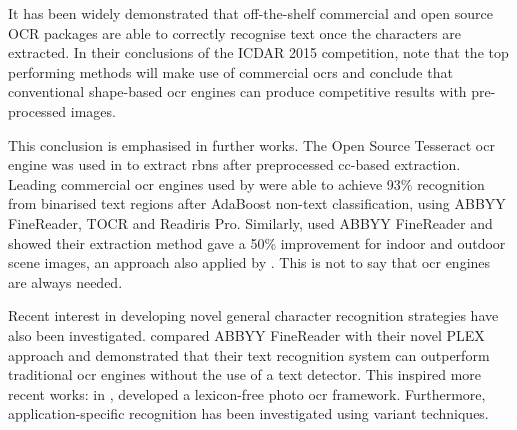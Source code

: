 It has been widely demonstrated that off-the-shelf commercial and open source OCR packages are able to correctly recognise text once the characters are extracted. In their conclusions of the ICDAR 2015 competition, \citet{Karatzas:2015tj} note that the top performing methods will make use of commercial \glspl{ocr} and conclude that conventional shape-based \gls{ocr} engines can produce competitive results with pre-processed images. 

This conclusion is emphasised in further works. The Open Source Tesseract \gls{ocr} engine was used in \citet{Benami:2012jf} to extract \glspl{rbn} after preprocessed \gls{cc}-based extraction. Leading commercial \gls{ocr} engines used by \citet{XiangrongChen:2004ha} were able to achieve 93\% recognition from binarised text regions after AdaBoost non-text classification, using ABBYY FineReader, TOCR and Readiris Pro. Similarly, \citet{Gatos:2005wd} used ABBYY FineReader and showed their extraction method gave a 50\% improvement for indoor and outdoor scene images, an approach also applied by \citet{XiangrongChen:2004ha}. This is not to say that \gls{ocr} engines are always needed.

Recent interest in developing novel general character recognition strategies have also been investigated. \citet{Wang:2011tw} compared ABBYY FineReader with their novel PLEX approach and demonstrated that their text recognition system can outperform traditional \gls{ocr} engines without the use of a text detector. This inspired more recent works: in \citeyear{Lee:2016uy}, \citet{Lee:2016uy} developed a lexicon-free photo \gls{ocr} framework. Furthermore, application-specific recognition has been investigated using variant techniques.

